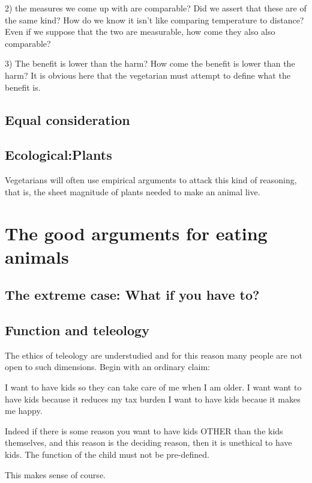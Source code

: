 2) the measures we come up with are comparable? Did we assert that these are of the same kind? How do we know it isn't like comparing temperature to distance? Even if we suppose that the two are measurable, how come they also also comparable?  

3) The benefit is lower than the harm? How come the benefit is lower than the harm? It is obvious here that the vegetarian must attempt to define what the benefit is. 

\section{Equal consideration}

\section{Ecological:Plants}

Vegetarians will often use empirical arguments to attack this kind of reasoning, that is, the sheet magnitude of plants needed to make an animal live. 


\chapter{The good arguments for eating animals}

\section{The extreme case: What if you have to?}

\section{Function and teleology}

The ethics of teleology are understudied and for this reason many people are not open to such dimensions. Begin with an ordinary claim:

I want to have kids so they can take care of me when I am older.
I want want to have kids because it reduces my tax burden
I want to have kids becaue it makes me happy. 

Indeed if there is some reason you want to have kids OTHER than the kids themselves, and this reason is the deciding reason, then it is unethical to have kids. The function of the child must not be pre-defined. 

This makes sense of course. 